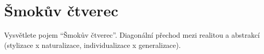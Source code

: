\section{Šmokův čtverec}
Vysvětlete pojem \enquote{Šmokův čtverec}. Diagonální přechod mezi realitou a abstrakcí (stylizace x naturalizace, 
individualizace x generalizace).